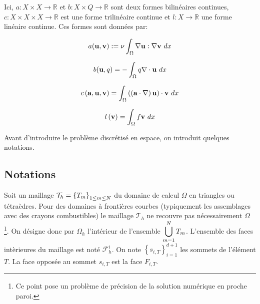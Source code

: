 \begin{appendix}
Ici, $ a: X\times X \longrightarrow \mathbb R $ et $ b: X\times Q \longrightarrow \mathbb R $ sont deux formes bilin\'eaires continues,
$ c: X\times X \times X\longrightarrow \mathbb R $ est une forme trilin\'eaire continue et $ l: X \longrightarrow \mathbb R $
une forme lin\'eaire continue. Ces formes sont donn\'ees par:

\begin{equation}
\ds{
a(\mbf{u}, \mbf{v}):= \nu \int _{\Omega}\nabla \mbf{u}: \nabla \mbf{v}\ dx
}
\end{equation}

\begin{equation}
\ds{
b (\mbf{u},{q}) =-\int _{\Omega} q \nabla \cdot \mbf{u}\ dx
}
\end{equation}

\begin{equation}
\ds{
c \left(  \mbf{a}, \mbf{u}, \mbf{v} \right) = \int _{\Omega}
  \left(  \left( \mbf{a}\cdot \nabla \right) \mbf{u} \right) \cdot \mbf{v}
  \ dx
}
\end{equation}

\begin{equation}
\ds{
l \left(   \mbf{v} \right) =\int _{\Omega}
  f  \mbf{v}
  \ dx
}
\end{equation}

Avant d'introduire le probl\`eme discr\'etis\'e en espace, on introduit quelques notations.

\subsection{Notations}


Soit un maillage $ \ds{\mathcal T _h=\left\lbrace T_m \right\rbrace _{1\leq m\leq N}}$ du domaine de calcul $ \Omega $ en
triangles ou t\'etra\`edres. Pour des domaines \`a fronti\`eres courbes (typiquement les assemblages avec des crayons combustibles)
le maillage $ \mathcal T _h $ ne recouvre pas n\'ecessairement $ \Omega $ \footnote{Ce point pose un probl\`eme de pr\'ecision de la solution
num\'erique en proche paroi.}. On d\'esigne donc par $\Omega _h$ l'int\'erieur de l'ensemble $\ds{ \bigcup _{m=1}^{N}T_m}$.
L'ensemble des faces int\`erieures du maillage est not\'e $\mathcal F _h^i$. On note $ \left\lbrace s_{i,T} \right\rbrace _{i=1}^{d+1}$ les sommets
de l'\'el\'ement $T$. La face oppos\'ee au sommet $s_{i,T}$ est la face $ F_{i,T}$. 



\end{appendix}

